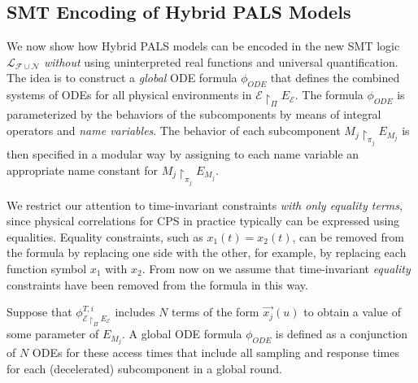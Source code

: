 \subsection{SMT Encoding of Hybrid PALS Models}


We now show how Hybrid PALS models
can be  encoded in the new SMT logic $\mathcal{L}_{\mathcal{F}\cup\mathcal{N}}$
\emph{without}  using uninterpreted real functions and universal quantification.
The idea is to construct a \emph{global} ODE formula $\phi_{\mathit{ODE}}$
that defines the combined systems of ODEs for all physical environments
in $\mathcal{E} \restriction_{\Pi} E_\mathcal{E}$.
The formula $\phi_{\mathit{ODE}}$ is parameterized by the behaviors of 
the subcomponents by means of integral operators and \emph{name variables}.
The behavior of each subcomponent $M_j \restriction_{\pi_j} E_{M_j}$ is then
specified in a modular way by assigning to each name variable an appropriate name constant for $M_j \restriction_{\pi_j} E_{M_j}$.

We restrict our attention to time-invariant constraints \emph{with only equality terms},
since physical correlations for CPS in practice typically can be expressed using
equalities.
Equality  constraints, such as $x_1(t) = x_2(t)$,  can be removed
from the formula  by replacing one side with the other, 
for example, by replacing each function symbol $x_1$ with  $x_2$.
From now on we assume that time-invariant \emph{equality} constraints
have been  removed from the formula 
in this way.



Suppose that %
$\phi_{\mathcal{E} \restriction_{\Pi} E_\mathcal{E}}^{T,i}$ 
includes $N$ terms of the form $\vec{x_j}(u)$ to obtain a value of some parameter of $E_{M_j}$.
A global ODE formula $\phi_{\mathit{ODE}}$
is defined as a conjunction of $N$ ODEs for these access times
that include all sampling and response times for each (decelerated) subcomponent in a global round.

